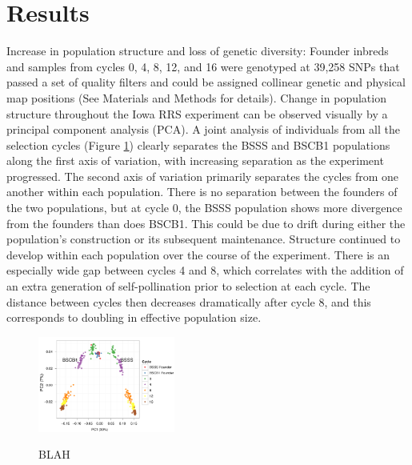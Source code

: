 \section*{Results}
Increase in population structure and loss of genetic diversity:  Founder inbreds and samples from cycles 0, 4, 8, 12, and 16 were genotyped at 39,258 SNPs that passed a set of quality filters and could be assigned collinear genetic and physical map positions (See Materials and Methods for details). Change in population structure throughout the Iowa RRS experiment can be observed visually by a principal component analysis (PCA). A joint analysis of individuals from all the selection cycles (Figure \ref{fig:pca}) clearly separates the BSSS and BSCB1 populations along the first axis of variation, with increasing separation as the experiment progressed. The second axis of variation primarily separates the cycles from one another within each population. There is no separation between the founders of the two populations, but at cycle 0, the BSSS population shows more divergence from the founders than does BSCB1. This could be due to drift during either the population’s construction or its subsequent maintenance. Structure continued to develop within each population over the course of the experiment. There is an especially wide gap between cycles 4 and 8, which correlates with the addition of an extra generation of self-pollination prior to selection at each cycle. The distance between cycles then decreases dramatically after cycle 8, and this corresponds to doubling in effective population size.

\begin{figure}[tb]   
  \begin{center}
   \vspace{-0mm}
   \includegraphics[width=0.4\textwidth]{fig1}
   \renewcommand{\baselinestretch}{0.9}
   \vspace{-3mm}
   \caption{BLAH} 
\vspace{-6mm}
    \label{fig:pca}
  \end{center}
\end{figure}

